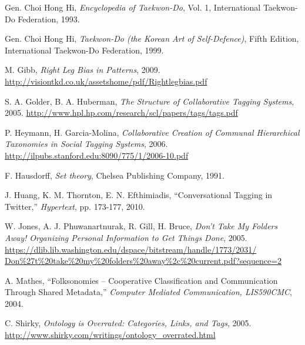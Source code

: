\documentclass[10pt,twocolumn,a4paper]{article}
\begin{document}
\begin{thebibliography}{99}
    \small  %

      Gen. Choi Hong Hi,
      \emph{Encyclopedia of Taekwon-Do}, Vol. 1,
      International Taekwon-Do Federation, 1993.

      Gen. Choi Hong Hi,
      \emph{Taekwon-Do (the Korean Art of Self-Defence)}, Fifth Edition,
      International Taekwon-Do Federation, 1999.

      M. Gibb,
      \emph{Right Leg Bias in Patterns}, 2009.
      \url{http://visiontkd.co.uk/assetshome/pdf/Rightlegbias.pdf}

      S. A. Golder, B. A. Huberman,
      \emph{The Structure of Collaborative Tagging Systems}, 2005.
      \url{http://www.hpl.hp.com/research/scl/papers/tags/tags.pdf}

      P. Heymann, H. Garcia-Molina,
      \emph{Collaborative Creation of Communal Hierarchical Taxonomies in
      Social Tagging Systems}, 2006.
      \url{http://ilpubs.stanford.edu:8090/775/1/2006-10.pdf}

      F. Hausdorff,
      \emph{Set theory},
      Chelsea Publishing Company, 1991.

      J. Huang, K. M. Thornton, E. N. Efthimiadis,
      ``Conversational Tagging in Twitter,''
      \emph{Hypertext}, pp. 173-177, 2010.

      W. Jones, A. J. Phuwanartnurak, R. Gill, H. Bruce,
      \emph{Don't Take My Folders Away! Organizing Personal Information to Get
      Things Done}, 2005.
      \url{https://dlib.lib.washington.edu/dspace/bitstream/handle/1773/2031/
           Don%

      A. Mathes,
      ``Folksonomies -- Cooperative Classification and Communication Through
      Shared Metadata,''
      \emph{Computer Mediated Communication, LIS590CMC}, 2004.

      C. Shirky,
      \emph{Ontology is Overrated: Categories, Links, and Tags}, 2005.
      \url{http://www.shirky.com/writings/ontology_overrated.html}

\end{thebibliography}
\end{document}
